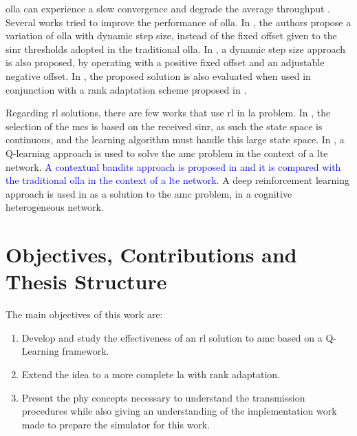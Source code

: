\Gls{olla} can experience a slow convergence and degrade the average throughput \cite{10.1145/3341216.3342212}.
%
Several works tried to improve the performance of \gls{olla}.
%
In \cite{Blanquez-Casado2016}, the authors propose a variation of \gls{olla} with dynamic step size, instead of the fixed offset given to the \gls{sinr} thresholds adopted in the traditional \gls{olla}.
%
In \cite{Sarret2015}, a dynamic step size approach is also proposed, by operating with a positive fixed offset and an adjustable negative offset.
%
In \cite{Sarret2015}, the proposed solution is also evaluated when used in conjunction with a rank adaptation scheme proposed in \cite{catania2015distributed}.

Regarding \gls{rl} solutions, there are few works that use \gls{rl} in \gls{la} problem.
%
In \cite{continuousState}, the selection of the \gls{mcs} is based on the received \gls{sinr}, as such the state space is continuous, and the learning algorithm must handle this large state space.
%
In \cite{bruno2014robust}, a Q-learning approach is used to solve the \gls{amc} problem in the context of a \gls{lte} network.
%
\textcolor{blue}{
A contextual bandits approach is proposed in \cite{10.1145/3341216.3342212} and it is compared with the traditional \gls{olla} in the context of a \gls{lte} network.
}
%
A deep reinforcement learning approach is used in \cite{DRL_AMC} as a solution to the \gls{amc} problem, in a cognitive heterogeneous network.



\section{Objectives, Contributions and Thesis Structure}

The main objectives of this work are:
\begin{enumerate}
    \item Develop and study the effectiveness of an \gls{rl} solution to \gls{amc} based on a Q-Learning framework.
    \item Extend the idea to a more complete \gls{la} with rank adaptation.
    \item Present the \gls{phy} concepts necessary to understand the transmission procedures while also giving an understanding of the implementation work made to prepare the simulator for this work.
\end{enumerate}

